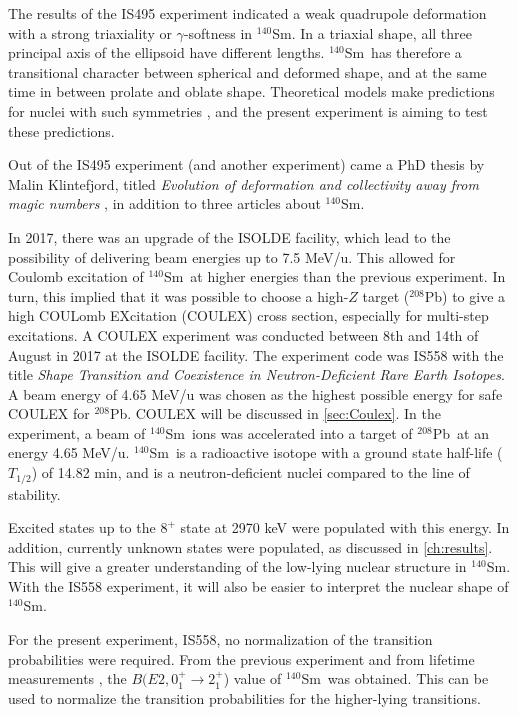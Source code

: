 \documentclass[twoside,english]{uiofysmaster/uiofysmaster}
\newcommand{\Sm}{$^{140}$Sm} %
\newcommand{\Pb}{$^{208}$Pb}
\newcommand{\ga}{$\gamma$}
\let\orgautoref\autoref
\renewcommand{\autoref}
        {%
		 \def\sectionautorefname{Section}%
		 \def\subsectionautorefname{Section}%
		 \def\subsubsectionautorefname{Section}%
		 \def\chapterautorefname{Chapter}%
          \orgautoref}
\begin{document}
The results of the IS495 experiment indicated a weak quadrupole deformation with a strong triaxiality or \ga-softness in \Sm.
In a triaxial shape, all three principal axis of the ellipsoid have different lengths.
\Sm\ has therefore a transitional character between spherical and deformed shape, and at the same time in between prolate and oblate shape.
Theoretical models make predictions for nuclei with such symmetries \cite{Iachello2000}, and the present experiment is aiming to test these predictions.

Out of the IS495 experiment (and another experiment) came a PhD thesis by Malin Klintefjord, titled \textit{Evolution of deformation and collectivity away from magic numbers} \cite{Klintefjord}, in addition to three articles \cite{Klintefjord2015, Samorajczyk2015, Klintefjord2016} about \Sm.

In 2017, there was an upgrade of the ISOLDE facility, which lead to the possibility of delivering beam energies up to 7.5 MeV/u. 
This allowed for Coulomb excitation of \Sm\ at higher energies than the previous experiment.
In turn, this implied that it was possible to choose a high-$Z$ target (\Pb) to give a high COULomb EXcitation (COULEX) cross section, especially for multi-step excitations.
A COULEX experiment was conducted between 8th and 14th of August in 2017 at the ISOLDE facility.
The experiment code was IS558 with the title \textit{Shape Transition and Coexistence in Neutron-Deficient Rare Earth Isotopes}.
A beam energy of 4.65 MeV/u was chosen as the highest possible energy for safe COULEX for \Pb.
COULEX will be discussed in \autoref{sec:Coulex}.
In the experiment, a beam of \Sm\ ions was accelerated into a target of \Pb\ at an energy 4.65 MeV/u.
\Sm\ is a radioactive isotope with a ground state half-life ($T_{1/2}$) of 14.82 min, and is a neutron-deficient nuclei compared to the line of stability.

Excited states up to the $8^+$ state at 2970 keV were populated with this energy.
In addition, currently unknown states were populated, as discussed in \autoref{ch:results}.
This will give a greater understanding of the low-lying nuclear structure in \Sm.
With the IS558 experiment, it will also be easier to interpret the nuclear shape of \Sm.

For the present experiment, IS558, no normalization of the transition probabilities were required.
From the previous experiment \cite{Klintefjord2016} and from lifetime measurements \cite{BelloGarrote2015}, the $B(E2, 0_1^+ \rightarrow 2_1^+$) value of \Sm\ was obtained. 
This can be used to normalize the transition probabilities for the higher-lying transitions.
\end{document}
